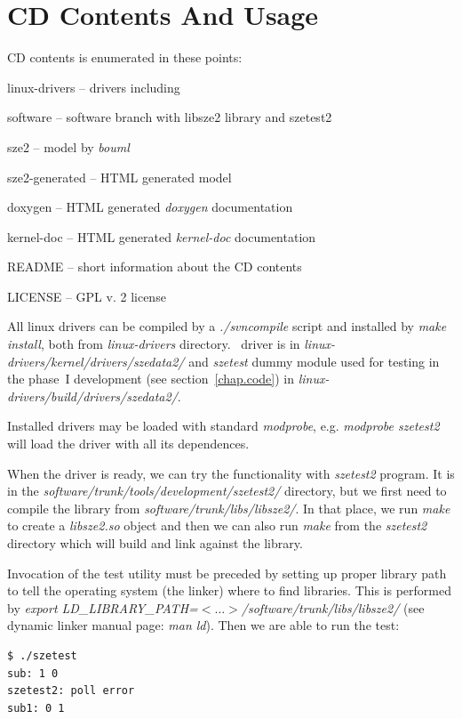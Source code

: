 \chapter{CD Contents And Usage}
  CD contents is enumerated in these points:
  \begin{CompactItemize}
    \item linux-drivers -- drivers including \sze
    \item software -- software branch with libsze2 library and szetest2
    \item sze2 -- model by \emph{bouml}
    \item sze2-generated -- HTML generated model
    \item doxygen -- HTML generated \emph{doxygen} documentation
    \item kernel-doc -- HTML generated \emph{kernel-doc} documentation
    \item README -- short information about the CD contents
    \item LICENSE -- GPL v. 2 license
  \end{CompactItemize}

  All linux drivers can be compiled by a \emph{./svncompile} script and
  installed by \emph{make install}, both from \emph{linux-drivers} directory.
  \sze\ driver
  is in \emph{linux-drivers/kernel/drivers/szedata2/} and \emph{szetest} dummy
  module used for testing in the phase~I development (see
  section~\ref{chap.code}) in \emph{linux-drivers/build/drivers/szedata2/}.

  Installed drivers may be loaded with standard \emph{modprobe}, e.g.
  \emph{modprobe szetest2} will load the driver with all its dependences.

  When the driver is ready, we can try the functionality with \emph{szetest2}
  program. It is in the \emph{software/trunk/tools/development/szetest2/}
  directory, but we first need to compile the library from
  \emph{software/trunk/libs/libsze2/}. In
  that place, we run \emph{make} to create a \emph{libsze2.so} object and then
  we can also run \emph{make} from the \emph{szetest2} directory which will
  build and link against the library.

  Invocation of the test utility must be preceded by setting up proper
  library path to tell the operating system (the linker) where to find
  libraries. This is performed by \emph{export
  LD\_LIBRARY\_PATH=$<\ldots>$/software/trunk/libs/libsze2/} (see dynamic
  linker manual page: \emph{man ld}). Then we are able to run the test:
  \vspace{.5em}
\begin{verbatim}
$ ./szetest
sub: 1 0
szetest2: poll error
sub1: 0 1
\end{verbatim}
  \vspace{.5em}

